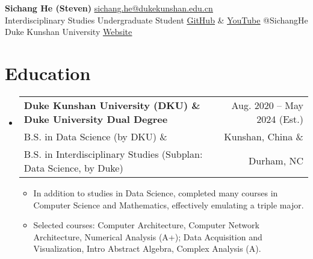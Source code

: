 \documentclass[letterpaper,11pt]{article}
\makeatletter
\newcommand{\CVItem}[1]{
  \item{\small
    {#1 \vspace{-2pt}}
  }
}
\newcommand{\CVSubheadingFrame}[1]{
  \vspace{-2pt}\item
    \begin{tabular*}{0.97\textwidth}[t]{l@{\extracolsep{\fill}}r}
        #1
    \end{tabular*}\vspace{-7pt}
}
\newcommand{\CVSubHeadingListStart}{\begin{itemize}[leftmargin=0.5cm, label={}]}
\newcommand{\CVSubHeadingListEnd}{\end{itemize}}
\newcommand{\CVItemListStart}{\begin{itemize}}
\newcommand{\CVItemListEnd}{\end{itemize}\vspace{-5pt}}
\newcommand{\uhref}[2]{\href{#1}{\underline{#2}}}
\makeatother
\begin{document}
\noindent
\textbf{\Huge Sichang He (Steven)}\hfill
\uhref{mailto:sichang.he@dukekunshan.edu.cn}
    {\small sichang.he@dukekunshan.edu.cn}\\[3pt]
Interdisciplinary Studies Undergraduate Student\hfill
{\small\uhref{https://github.com/SichangHe}{GitHub} \&
    \uhref{https://www.youtube.com/@sichanghe}{YouTube} @SichangHe
}\\
Duke Kunshan University\hfill
\uhref{https://sichanghe.github.io/}{\small Website}

\section{Education}
\CVSubHeadingListStart
\CVSubheadingFrame
{\textbf{Duke Kunshan University (DKU) \& Duke University Dual Degree}&
    Aug. 2020 -- May 2024 (Est.)\\
    \small B.S. in Data Science (by DKU) \&&
    Kunshan, China \&\\
    \small B.S. in Interdisciplinary Studies (Subplan: Data Science, by Duke)&
    Durham, NC
}
\CVItemListStart
    \CVItem
    {In addition to studies in Data Science,
        completed many courses in Computer Science and Mathematics,
        effectively emulating a triple major.
    }
    \CVItem
    {Selected courses: Computer Architecture, Computer Network Architecture,
        Numerical Analysis (A+);
        Data Acquisition and Visualization, Intro Abstract Algebra,
        Complex Analysis (A).
    }
\CVItemListEnd
\CVSubHeadingListEnd

\begin{refsection}
\nocite{he2024fedkit}
\printbibliography[title=Conference Publication]
\end{refsection}
\end{document}
